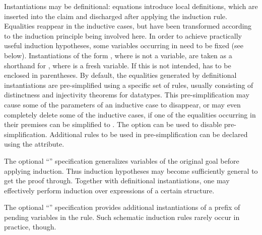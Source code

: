 \begin{isabellebody}
\begin{isamarkuptext}
\begin{description}
  Instantiations may be definitional: equations 
  introduce local definitions, which are inserted into the claim and
  discharged after applying the induction rule.  Equalities reappear
  in the inductive cases, but have been transformed according to the
  induction principle being involved here.  In order to achieve
  practically useful induction hypotheses, some variables occurring in
   need to be fixed (see below).  Instantiations of the form
  , where  is not a variable, are taken as a
  shorthand for \mbox{}, where  is a fresh
  variable. If this is not intended,  has to be enclosed in
  parentheses.  By default, the equalities generated by definitional
  instantiations are pre-simplified using a specific set of rules,
  usually consisting of distinctness and injectivity theorems for
  datatypes. This pre-simplification may cause some of the parameters
  of an inductive case to disappear, or may even completely delete
  some of the inductive cases, if one of the equalities occurring in
  their premises can be simplified to .  The  option can be used to disable pre-simplification.
  Additional rules to be used in pre-simplification can be declared
  using the \hypertarget{attribute.induct-simp}{\hyperlink{attribute.induct-simp}{\mbox{}}} attribute.

  The optional ``''
  specification generalizes variables  of the original goal before applying induction.  Thus
  induction hypotheses may become sufficiently general to get the
  proof through.  Together with definitional instantiations, one may
  effectively perform induction over expressions of a certain
  structure.
  
  The optional ``''
  specification provides additional instantiations of a prefix of
  pending variables in the rule.  Such schematic induction rules
  rarely occur in practice, though.


\end{description}
\end{isamarkuptext}
\end{isabellebody}
